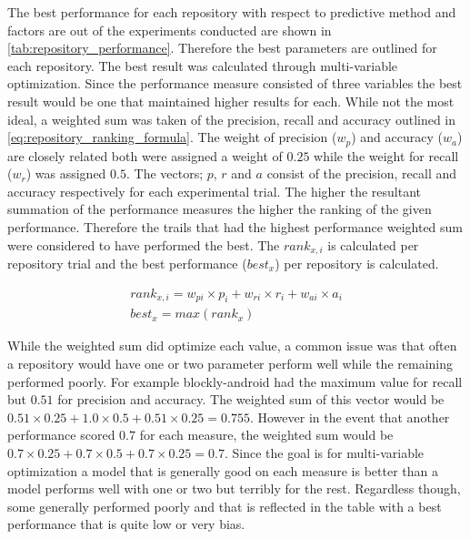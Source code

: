 The best performance for each repository with respect to predictive method and factors are out of the experiments conducted are shown in \autoref{tab:repository_performance}. Therefore the best parameters are outlined for each repository. The best result was calculated through multi-variable optimization. Since the performance measure consisted of three variables the best result would be one that maintained higher results for each. While not the most ideal, a weighted sum was taken of the precision, recall and accuracy outlined in \autoref{eq:repository_ranking_formula}. The weight of precision ($w_{p}$) and accuracy ($w_{a}$) are closely related both were assigned a weight of $0.25$ while the weight for recall ($w_{r}$) was assigned $0.5$. The vectors; $p$, $r$ and $a$ consist of the precision, recall and accuracy respectively for each experimental trial. The higher the resultant summation of the performance measures the higher the ranking of the given performance. Therefore the trails that had the highest performance weighted sum were considered to have performed the best. The $rank_{x,i}$ is calculated per repository trial and the best performance ($best_{x}$) per repository is calculated.

\begin{equation} 
\label{eq:repository_ranking_formula}
\begin{matrix}
rank_{x,i} = w_{pi} \times p_i + w_{ri} \times r_i + w_{ai} \times a_i \\
best_{x} = max(rank_{x})
\end{matrix}
\end{equation}

While the weighted sum did optimize each value, a common issue was that often a repository would have one or two parameter perform well while the remaining performed poorly. For example blockly-android had the maximum value for recall but $0.51$ for precision and accuracy. The weighted sum of this vector would be $0.51 \times 0.25 + 1.0 \times 0.5 + 0.51 \times 0.25 = 0.755$. However in the event that another performance scored $0.7$ for each measure, the weighted sum would be $0.7 \times 0.25 + 0.7 \times 0.5 + 0.7 \times 0.25 = 0.7$. Since the goal is for multi-variable optimization a model that is generally good on each measure is better than a model performs well with one or two but terribly for the rest. Regardless though, some generally performed poorly and that is reflected in the table with a best performance that is quite low or very bias. 

